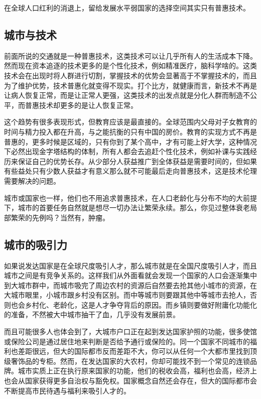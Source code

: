\documentclass[
]{book}
\begin{document}
在全球人口红利的消退上，留给发展水平弱国家的选择空间其实只有普惠技术。

\hypertarget{ux57ceux5e02ux4e0eux6280ux672f}{%
\subsection{城市与技术}\label{ux57ceux5e02ux4e0eux6280ux672f}}

前面所说的交通就是一种普惠技术，这类技术可以让几乎所有人的生活成本下降。然而现在资本追逐的技术更多的是个性化技术，例如精准医疗，脑科学啥的。这类技术会在出现时将人群进行切割，掌握技术的优势会显著高于不掌握技术的，而且为了维护优势，技术普惠化就变得不现实。打个比方，就健康而言，新技术不再是让病人恢复正常，而是让正常人更强，这类技术的出发点就是分化人群而制造不公平，而普惠技术却更多的是让人恢复正常。

这个趋势有很多表现形式，但教育应该是最直接的。全球范围内父母对子女教育的时间与精力投入都在升高，与之能抗衡的只有中国的房价。教育的实现方式不再是普惠的，更多时候是区域的，只有你到了某个高中，才有可能上好大学，这种情况下必然出现金字塔结构的体制，所有人都会去追赶个性化技术，例如补课与实践经历来保证自己的优势长存。从少部分人获益推广到全体获益是需要时间的，但如果有些益处只有少数人获益才有意义那么就不可能最后走向普惠技术，这是技术伦理需要解决的问题。

城市或国家也一样，他们也不用追求普惠技术，在人口老龄化与分布不均的大前提下，城市的首要任务自然就是想尽一切办法让繁荣永续。那么，你见过整体衰老局部繁荣的先例吗？当然有，肿瘤。

\hypertarget{ux57ceux5e02ux7684ux5438ux5f15ux529b}{%
\subsection{城市的吸引力}\label{ux57ceux5e02ux7684ux5438ux5f15ux529b}}

如果说发达国家是在全球尺度吸引人才，那么城市就是在全国尺度吸引人才，而且城市之间是有竞争关系的。这样我们从外面看就会发现一个国家的人口会逐渐集中到大城市群中，而城市吸完了周边农村的资源后自然要去抢其他小城市的资源，在大城市眼里，小城市跟乡村没有区别。而中等城市则要跟其他中等城市去抢人，否则也会乡村化、老龄化，这是人才争夺背后的原因。而乡镇则要做好附庸化功能化的准备，不然被大中城市抽干了血，几乎没有发展前景。

而且可能很多人也体会到了，大城市户口正在起到发达国家护照的功能，很多使馆或保险公司是通过居住地来判断是否给予通行或保险的。同一个国家不同城市的福利也差距很远，但大的国际都市反而差距不大，你可以从任何一个大都市里找到顶级奢饰品的专柜。然而，在发达国家的大农村，你却可能找不到一个常见的连锁品牌。城市实质上正在执行原来国家的功能，他们的税收会高，福利也会高，经济上也会从国家获得更多自治权与豁免权。国家概念自然还会存在，但大的国际都市会不断提高市民待遇与福利来吸引人才的。
\end{document}
